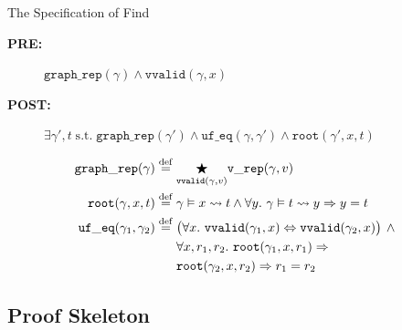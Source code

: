 \documentclass[professionalfonts, xcolor=table]{beamer}
\newcommand{\defeq}{\mathbin{\overset{\mathrm{def}}{=}}}
\begin{document}
\begin{frame}{The Specification of Find}
  \centering
  \colorbox{lightg}{\parbox{.9\textwidth}{
      \begin{description}
      \item[{\bf PRE:}] $\mathtt{graph\_rep}(\gamma) \wedge \mathtt{vvalid}(\gamma, x)$
      \item[{\bf POST:}] $\exists \gamma', t\;\text{s.t.}\;\mathtt{graph\_rep}(\gamma')\wedge\mathtt{uf\_eq}(\gamma, \gamma') \wedge \mathtt{root}(\gamma', x, t)$
  \end{description}}}
  \pause
  \vskip10pt
  \colorbox{lightg}{\parbox{.9\textwidth}{
      \begin{align*}
        \mathtt{graph\_rep}(\gamma)\;\defeq\; &
        \underset{\mathtt{vvalid}(\gamma, v)}{\bigstar}\mathtt{v\_rep}(\gamma, v)\\
        \mathtt{root}(\gamma, x, t) \;\defeq\; &\gamma \vDash x \leadsto t \wedge
        \forall y.~ \gamma \vDash t \leadsto y \Rightarrow y = t\\
        \mathtt{uf\_eq}(\gamma_1, \gamma_2)\; \defeq\; &\big(\forall x.~
        \mathtt{vvalid}(\gamma_1, x)\Leftrightarrow \mathtt{vvalid}(\gamma_2,x)\big)
        \, \wedge\, \null\\
        & \forall x, r_1, r_2.~ \mathtt{root}(\gamma_1, x, r_1) \Rightarrow\\
        &\mathtt{root}(\gamma_2, x, r_2) \Rightarrow r_1 = r_2
      \end{align*}
    }}
\end{frame}

\subsection{Proof Skeleton}
\end{document}
